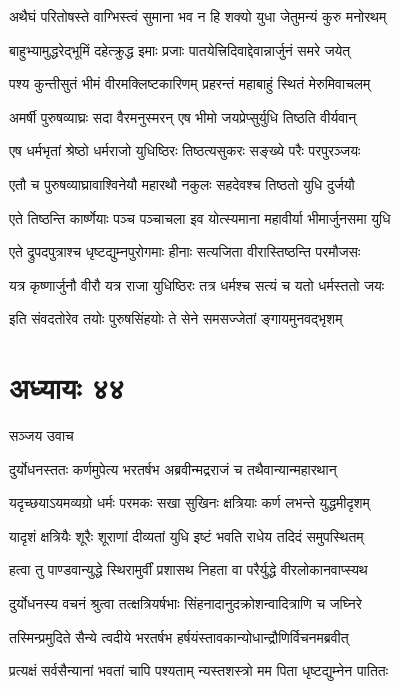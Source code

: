 \twolineshloka
{अथैघं परितोषस्ते वाग्भिस्त्वं सुमाना भव}
{न हि शक्यो युधा जेतुमन्यं कुरु मनोरथम्}


\twolineshloka
{बाहुभ्यामुद्धरेद्भूमिं दहेत्क्रुद्ध इमाः प्रजाः}
{पातयेत्त्रिदिवाद्देवान्नार्जुनं समरे जयेत्}


\twolineshloka
{पश्य कुन्तीसुतं भीमं वीरमक्लिष्टकारिणम्}
{प्रहरन्तं महाबाहुं स्थितं मेरुमिवाचलम्}


\twolineshloka
{अमर्षी पुरुषव्याघ्रः सदा वैरमनुस्मरन्}
{एष भीमो जयप्रेप्सुर्युधि तिष्ठति वीर्यवान्}


\twolineshloka
{एष धर्मभृतां श्रेष्ठो धर्मराजो युधिष्ठिरः}
{तिष्ठत्यसुकरः सङ्ख्ये परैः परपुरञ्जयः}


\twolineshloka
{एतौ च पुरुषव्याघ्रावाश्विनेयौ महारथौ}
{नकुलः सहदेवश्च तिष्ठतो युधि दुर्जयौ}


\twolineshloka
{एते तिष्ठन्ति कार्ष्णेयाः पञ्च पञ्चाचला इव}
{योत्स्यमाना महावीर्या भीमार्जुनसमा युधि}


\twolineshloka
{एते द्रुपदपुत्राश्च धृष्टद्युम्नपुरोगमाः}
{हीनाः सत्यजिता वीरास्तिष्ठन्ति परमौजसः}


\twolineshloka
{यत्र कृष्णार्जुनौ वीरौ यत्र राजा युधिष्ठिरः}
{तत्र धर्मश्च सत्यं च यतो धर्मस्ततो जयः}


\twolineshloka
{इति संवदतोरेव तयोः पुरुषसिंहयोः}
{ते सेने समसज्जेतां ङ्गायमुनवद्भृशम्}


\chapter{अध्यायः ४४}
\twolineshloka
{सञ्जय उवाच}
{}


\twolineshloka
{दुर्योधनस्ततः कर्णमुपेत्य भरतर्षभ}
{अब्रवीन्मद्रराजं च तथैवान्यान्महारथान्}


\twolineshloka
{यदृच्छयाऽयमव्यग्रो धर्मः परमकः सखा}
{सुखिनः क्षत्रियाः कर्ण लभन्ते युद्धमीदृशम्}


\twolineshloka
{यादृशं क्षत्रियैः शूरैः शूराणां दीव्यतां युधि}
{इष्टं भवति राधेय तदिदं समुपस्थितम्}


\twolineshloka
{हत्वा तु पाण्डवान्युद्धे स्थिरामुर्वीं प्रशासथ}
{निहता वा परैर्युद्धे वीरलोकानवाप्स्यथ}


\twolineshloka
{दुर्योधनस्य वचनं श्रुत्वा तत्क्षत्रियर्षभाः}
{सिंहनादानुदक्रोशन्वादित्राणि च जघ्निरे}


\twolineshloka
{तस्मिन्प्रमुदिते सैन्ये त्वदीये भरतर्षभ}
{हर्षयंस्तावकान्योधान्द्रौणिर्विचनमब्रवीत्}


\twolineshloka
{प्रत्यक्षं सर्वसैन्यानां भवतां चापि पश्यताम्}
{न्यस्तशस्त्रो मम पिता धृष्टद्युम्नेन पातितः}



